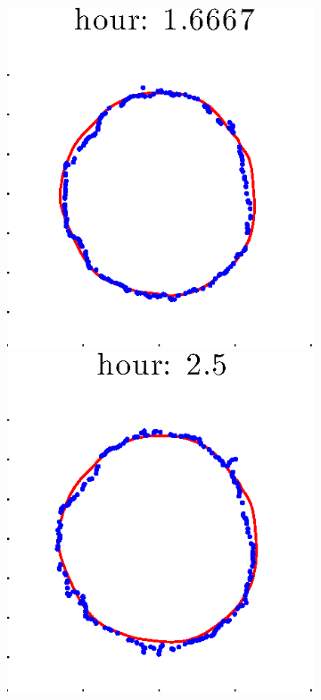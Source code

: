 \documentclass[12pt]{article}
\begin{document}
\begin{figure}[h!]
\begin{subfigure}[b]{.3\textwidth}
		\includegraphics[height=.15\textheight]{Pos0/secondhalf/first3.eps}
		\includegraphics[height=.15\textheight]{Pos0/secondhalf/first4.eps}

\end{subfigure}
\end{figure}
\end{document}

